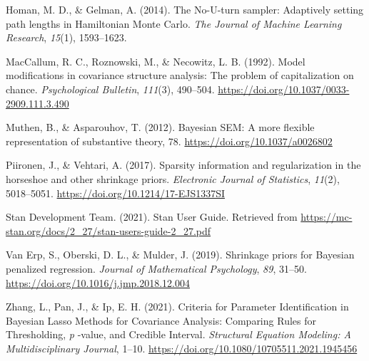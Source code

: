 \documentclass[
  english,
  man]{apa6}
\newlength{\cslhangindent}
\newlength{\cslentryspacingunit} %
\newenvironment{CSLReferences}[2] %
 {%
  \setlength{\parindent}{0pt}
  \ifodd #1
  \let\oldpar\par
  \def\par{\hangindent=\cslhangindent\oldpar}
  \fi
  \setlength{\parskip}{#2\cslentryspacingunit}
 }%
 {}
\begin{document}
\hypertarget{refs}{}
\begin{CSLReferences}{1}{0}
\leavevmode{}%
Homan, M. D., \& Gelman, A. (2014). The {No}-{U}-turn sampler: Adaptively setting path lengths in {Hamiltonian} {Monte} {Carlo}. \emph{The Journal of Machine Learning Research}, \emph{15}(1), 1593--1623.

\leavevmode{}%
MacCallum, R. C., Roznowski, M., \& Necowitz, L. B. (1992). Model modifications in covariance structure analysis: The problem of capitalization on chance. \emph{Psychological Bulletin}, \emph{111}(3), 490--504. \url{https://doi.org/10.1037/0033-2909.111.3.490}

\leavevmode{}%
Muthen, B., \& Asparouhov, T. (2012). Bayesian {SEM}: {A} more ﬂexible representation of substantive theory, 78. \url{https://doi.org/10.1037/a0026802}

\leavevmode{}%
Piironen, J., \& Vehtari, A. (2017). Sparsity information and regularization in the horseshoe and other shrinkage priors. \emph{Electronic Journal of Statistics}, \emph{11}(2), 5018--5051. \url{https://doi.org/10.1214/17-EJS1337SI}

\leavevmode{}%
Stan Development Team. (2021). Stan {User} {Guide}. Retrieved from \url{https://mc-stan.org/docs/2_27/stan-users-guide-2_27.pdf}

\leavevmode{}%
Van Erp, S., Oberski, D. L., \& Mulder, J. (2019). Shrinkage priors for {Bayesian} penalized regression. \emph{Journal of Mathematical Psychology}, \emph{89}, 31--50. \url{https://doi.org/10.1016/j.jmp.2018.12.004}

\leavevmode{}%
Zhang, L., Pan, J., \& Ip, E. H. (2021). Criteria for {Parameter} {Identification} in {Bayesian} {Lasso} {Methods} for {Covariance} {Analysis}: {Comparing} {Rules} for {Thresholding}, \emph{p} -value, and {Credible} {Interval}. \emph{Structural Equation Modeling: A Multidisciplinary Journal}, 1--10. \url{https://doi.org/10.1080/10705511.2021.1945456}

\end{CSLReferences}

\endgroup

\clearpage
\end{document}
